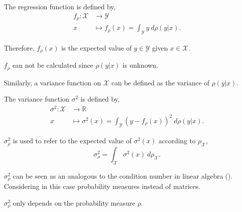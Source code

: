 \begin{definition} \label{def_regressionFunction}
The regression function is defined by,
\begin{equation} \begin{aligned} \label{eq_regressionFunction}
f_{\rho} \colon \mathcal{X} &\to \mathcal{Y}\\
x & \mapsto f_{\rho}(x) = \int_{\mathcal{Y}} y \ d\rho(y|x).
\end{aligned} \end{equation}
\end{definition}
Therefore, $f_{\rho}(x)$ is the expected value of $y \in \mathcal{Y}$ given $x \in \mathcal{X}$. 

\begin{remark} \label{remark_frho_unknown}
  $f_{\rho}$ can not be calculated since $\rho(y|x)$ is unknown. 
\end{remark}

Similarly, a variance function on $\mathcal{X}$ can be defined as the variance of $\rho(y|x)$.
\begin{definition} \label{def_varianceFunction} The variance function $\sigma^2$ is defined by,
\begin{align*}
\sigma^2 \colon \mathcal{X} &\to \mathbb{R}\\
x & \mapsto \sigma^2(x) = \int_{\mathcal{Y}} (y-f_{\rho}(x))^2 \ d\rho(y|x).
\end{align*}
\end{definition}

\begin{definition}
  $\sigma_{\rho}^2$ is used to refer to the expected value of $\sigma^2(x)$ according to $\rho_{\mathcal{X}}$,
  \begin{equation*}
    \sigma_{\rho}^2 = \int_{\mathcal{X}} \sigma^2(x) \ d\rho_{\mathcal{X}}.
  \end{equation*}
\end{definition}

\begin{remark}
  $\sigma_{\rho}^2$ can be seen as an analogous to the condition number in linear algebra (\textcite{cucker2001}). Considering in this case probability measures instead of matrices.
\end{remark}

\begin{remark} \label{remark_sigmaRhoSquare_onlyDenpendsOnRho}
  $\sigma_{\rho}^2$ only depends on the probability measure $\rho$.
\end{remark}

